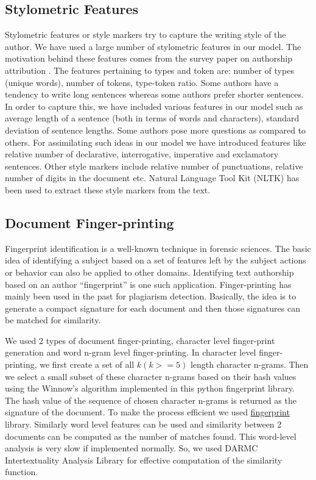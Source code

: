 \documentclass[letterpaper]{article}
\begin{document}
\subsection{Stylometric Features}
Stylometric features or style markers try to capture the writing style of the author. We have used a large number of stylometric features in our model. The motivation behind these features comes from the survey paper on authorship attribution \cite{survey}. The features pertaining to types and token are: number of types (unique words), number of tokens, type-token ratio. Some authors have a tendency to write long sentences whereas some authors prefer shorter sentences. In order to capture this, we have included various features in our model such as average length of a sentence (both in terms of words and characters), standard deviation of sentence lengths. Some authors pose more questions as compared to others. For assimilating such ideas in our model we have introduced features like relative number of declarative, interrogative, imperative and exclamatory sentences. Other style markers include relative number of punctuations, relative number of digits in the document etc. Natural Language Tool Kit (NLTK) has been used to extract these style markers from the text. 

\subsection{Document Finger-printing}
Fingerprint identification is a well-known technique in forensic sciences. The basic idea of identifying a subject based on a set of features left by the subject actions or behavior can also be applied to other domains. Identifying text authorship based on an author “fingerprint” is one such application. Finger-printing has mainly been used in the past for plagiarism detection. Basically, the idea is to generate a compact signature for each document and then those signatures can be matched for similarity.

We used 2 types of document finger-printing, character level finger-print generation and word n-gram level finger-printing. In character level finger-printing, we first create a set of all $k (k>=5)$ length character n-grams. Then we select a small subset of these character n-grams based on their hash values using the Winnow's algorithm\cite{schleimer2003winnowing} implemented in this python fingerprint library\cite{finger}. The hash value of the sequence of chosen character n-grams is returned as the signature of the document. To make the process efficient we used \href{https://github.com/kailashbuki/fingerprint}{fingerprint} library. Similarly word level features can be used and similarity between 2 documents can be computed as the number of matches found. This word-level analysis is very slow if implemented normally. So, we used DARMC Intertextuality Analysis Library\cite{DARMC} for effective computation of the similarity function.
\end{document}
